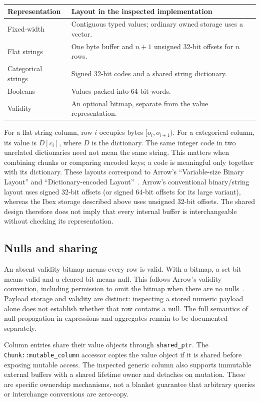 \documentclass[11pt,a4paper]{article}
\newcommand{\code}[1]{\nolinkurl{#1}}
\begin{document}
\begin{center}
  \begin{tabularx}{\linewidth}{@{}lX@{}}
    \toprule
    Representation & Layout in the inspected implementation\\
    \midrule
    Fixed-width & Contiguous typed values; ordinary owned storage uses a vector.\\
    Flat strings & One byte buffer and $n+1$ unsigned 32-bit offsets for $n$ rows.\\
    Categorical strings & Signed 32-bit codes and a shared string dictionary.\\
    Booleans & Values packed into 64-bit words.\\
    Validity & An optional bitmap, separate from the value representation.\\
    \bottomrule
  \end{tabularx}
\end{center}
For a flat string column, row $i$ occupies bytes
$[o_i,o_{i+1})$. For a categorical column, its value is $D[c_i]$, where $D$
is the dictionary. The same integer code in two unrelated dictionaries need
not mean the same string. This matters when combining chunks or comparing
encoded keys; a code is meaningful only together with its dictionary.
These layouts correspond to Arrow's ``Variable-size Binary Layout'' and
``Dictionary-encoded Layout''~\cite{arrowColumnar}. Arrow's conventional
binary/string layout uses signed 32-bit offsets (or signed 64-bit offsets
for its large variant), whereas the Ibex storage described above uses
unsigned 32-bit offsets. The shared design therefore does not imply that
every internal buffer is interchangeable without checking its representation.

\subsection{Nulls and sharing}
An absent validity bitmap means every row is valid. With a bitmap, a set bit
means valid and a cleared bit means null. This follows Arrow's validity
convention, including permission to omit the bitmap when there are no
nulls~\cite{arrowColumnar}. Payload storage and validity are
distinct: inspecting a stored numeric payload alone does not establish
whether that row contains a null. The full semantics of null propagation in
expressions and aggregates remain to be documented separately.

Column entries share their value objects through \code{shared_ptr}. The
\code{Chunk::mutable_column} accessor copies the value object if it is
shared before exposing mutable access. The inspected generic column also
supports immutable external buffers with a shared lifetime owner and detaches
on mutation. These are specific ownership mechanisms, not a blanket guarantee
that arbitrary queries or interchange conversions are zero-copy.
\end{document}
